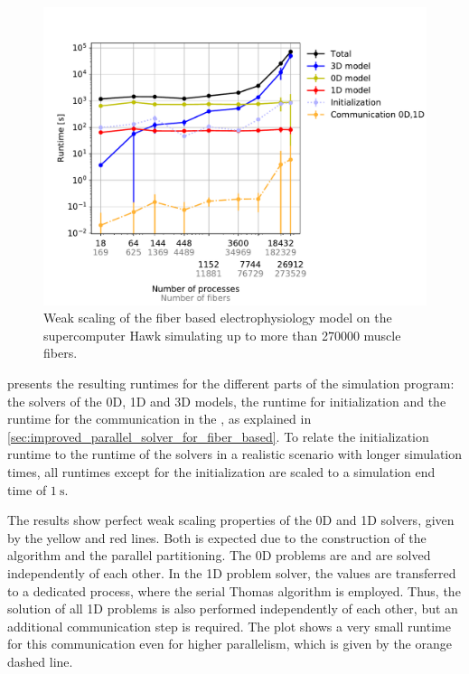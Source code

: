 \begin{figure}[H]
  \centering%
  \includegraphics[width=\textwidth]{images/results/studies/hawk_weak_scaling.pdf}%
  \caption{Weak scaling of the fiber based electrophysiology model on the supercomputer Hawk simulating up to more than \num{270000} muscle fibers.}%
  \label{fig:hawk_weak_scaling}%
\end{figure}

 presents the resulting runtimes for the different parts of the simulation program: the solvers of the 0D, 1D and 3D models, the runtime for initialization and the runtime for the communication in the , as explained in \cref{sec:improved_parallel_solver_for_fiber_based}.
To relate the initialization runtime to the runtime of the solvers in a realistic scenario with longer simulation times, all runtimes except for the initialization are scaled to a simulation end time of $\SI{1}{\second}$.

The results show perfect weak scaling properties of the 0D and 1D solvers, given by the yellow and red lines. Both is expected due to the construction of the algorithm and the parallel partitioning. The 0D problems are  and are solved independently of each other. In the 1D problem solver, the values are  transferred to a dedicated process, where the serial Thomas algorithm is employed. Thus, the solution of all 1D problems is also performed independently of each other, but an additional communication step is required.
The plot shows a very small runtime for this communication even for higher parallelism, which is given by the orange dashed line.

